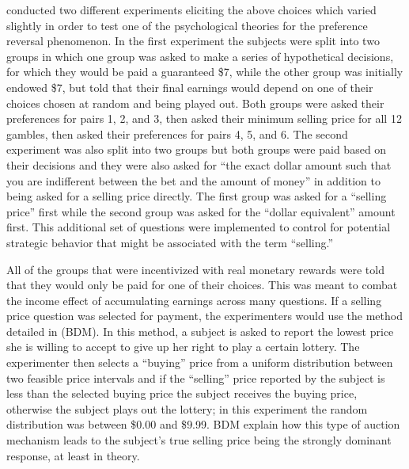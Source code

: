 \documentclass[../main.tex]{subfiles}
\begin{document}
\textcite{Grether1979} conducted two different experiments eliciting the above choices which  varied slightly in order to test one of the psychological theories for the preference reversal phenomenon.
In the first experiment the subjects were split into two groups in which one group was asked to make a series of hypothetical decisions, for which they would be paid a guaranteed \${7}, while the other group was initially endowed \${7}, but told that their final earnings would depend on one of their choices chosen at random and being played out.
Both groups were asked their preferences for pairs 1, 2, and 3, then asked their minimum selling price for all 12 gambles, then asked their preferences for pairs 4, 5, and 6.
The second experiment was also split into two groups but both groups were paid based on their decisions and they were also asked for \enquote{the exact dollar amount such that you are indifferent between the bet and the amount of money} in addition to being asked for a selling price directly.
The first group was asked for a \enquote{selling price} first while the second group was asked for the \enquote{dollar equivalent} amount first.
This additional set of questions were implemented to control for potential strategic behavior that might be associated with the term \enquote{selling.}

All of the groups that were incentivized with real monetary rewards were told that they would only be paid for one of their choices.
This was meant to combat the income effect of accumulating earnings across many questions.
If a selling price question was selected for payment, the experimenters would use the method detailed in \textcite{Becker1964} (BDM).
In this method, a subject is asked to report the lowest price she is willing to accept to give up her right to play a certain lottery.
The experimenter then selects a \enquote{buying} price from a uniform distribution between two feasible price intervals and if the \enquote{selling} price reported by the subject is less than the selected buying price the subject receives the buying price, otherwise the subject plays out the lottery; in this experiment the random distribution was between \${0.00} and \${9.99}.
BDM explain how this type of auction mechanism leads to the subject's true selling price being the strongly dominant response, at least in theory.
\end{document}
